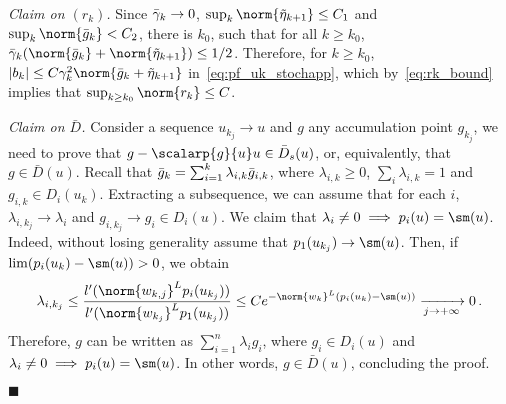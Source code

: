 \emph{Claim on $(r_k)$.} Since $\bar{\gamma}_k \rightarrow 0$, $\sup_{k} \norm{\tilde{\eta}_{k+1}} \leq C_1$ and $\sup_{k} \norm{\bg_k} < C_2$, there is $k_0$, such that for all $k \geq k_0$, $\bgamma_k (\norm{\bg_k} + \norm{\tilde{\eta}_{k+1}})\leq 1/2$. Therefore, for $k \geq k_0$, $|b_k| \leq C \gamma_k^2 \norm{\bg_k + \tilde{\eta}_{k+1}}$ in~\eqref{eq:pf_uk_stochapp}, which by~\eqref{eq:rk_bound} implies that $\sup_{k \geq k_0}\norm{r_k} \leq C$.

\emph{Claim on $\bar{D}$.} Consider a sequence $u_{k_j} \rightarrow u$ and $g$ any accumulation point $g_{k_j}$, we need to prove that $g - \scalarp{g}{u}u \in \bar{D}_s(u)$, or, equivalently, that $g \in \bar{D}(u)$. Recall that $\bar{g}_k = \sum_{i=1}^k \lambda_{i,k} \bar{g}_{i,k}$, where $\lambda_{i,k} \geq 0$, $\sum_{i} \lambda_{i,k} = 1$ and $g_{i,k} \in D_{i}(u_k)$. Extracting a subsequence, we can assume that for each $i$, $\lambda_{i, k_j} \rightarrow \lambda_i$ and $g_{i,k_j} \rightarrow g_i \in D_i(u)$.  We claim that $\lambda_i \neq 0 \implies p_i(u) = \sm(u)$. Indeed, without losing generality assume that $p_1(u_{k_j})\rightarrow \sm(u)$. Then, if $\lim (p_{i}(u_k) - \sm(u)) >0$, we obtain 
\begin{equation*}
  \lambda_{i,k_j} \leq \frac{l'(\norm{w_{k,j}}^L p_i(u_{k_j}))}{l'(\norm{w_{k_j}}^L p_1(u_{k_j}))} \leq C e^{-\norm{w_k}^L\left( p_i(u_k) - \sm(u)\right)}\xrightarrow[j \rightarrow + \infty]{} 0 \, .
\end{equation*}
Therefore, $g$ can be written as $ \sum_{i=1}^n \lambda_i g_i$, where $g_i \in D_i(u)$ and $\lambda_i \neq 0 \implies p_i(u) = \sm(u)$.
In other words, $g \in \bar{D}(u)$, concluding the proof. 

\hfill $\blacksquare$
